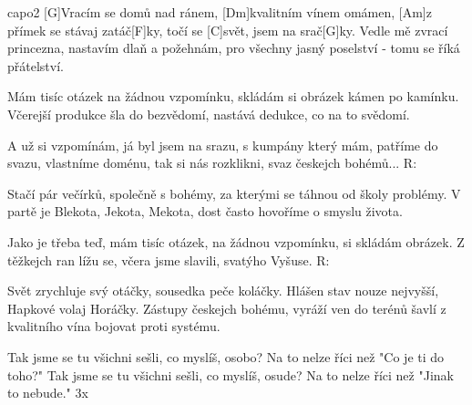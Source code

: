 \hfill capo2
[G]Vracím se domů nad ránem, [Dm]kvalitním vínem omámen,
[Am]z přímek se stávaj zatáč[F]ky, točí se [C]svět, jsem na srač[G]ky.
Vedle mě zvrací princezna, nastavím dlaň a požehnám,
pro všechny jasný poselství - tomu se říká přátelství.

Mám tisíc otázek na žádnou vzpomínku,
skládám si obrázek kámen po kamínku.
Včerejší produkce šla do bezvědomí,
nastává dedukce, co na to svědomí.

A už si vzpomínám, já byl jsem na srazu,
s kumpány který mám, patříme do svazu,
vlastníme doménu, tak si nás rozklikni,
svaz českejch bohémů...
R:

Stačí pár večírků, společně s bohémy,
za kterými se táhnou od školy problémy.
V partě je Blekota, Jekota, Mekota,
dost často hovoříme o smyslu života.

Jako je třeba teď, mám tisíc otázek,
na žádnou vzpomínku, si skládám obrázek.
Z těžkejch ran lížu se, včera jsme slavili,
svatýho Vyšuse.
R:

Svět zrychluje svý otáčky, sousedka peče koláčky.
Hlášen stav nouze nejvyšší, Hapkové volaj Horáčky.
Zástupy českejch bohému, vyráží ven do terénů
šavlí z kvalitního vína bojovat proti systému.

Tak jsme se tu všichni sešli, co myslíš, osobo?
Na to nelze říci než "Co je ti do toho?"
Tak jsme se tu všichni sešli, co myslíš, osude?
Na to nelze říci než "Jinak to nebude." 3x

